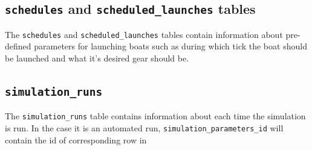 \subsection{\texttt{schedules} and \texttt{scheduled\_launches}
  tables}
The \texttt{schedules} and \texttt{scheduled\_launches} tables contain
information about pre-defined parameters for launching boats such as
during which tick the boat should be launched and what it's desired
gear should be.


\subsection{\texttt{simulation\_runs}}
The \texttt{simulation\_runs} table contains information about each
time the simulation is run. In the case it is an automated run,
\texttt{simulation\_parameters\_id} will contain the id of corresponding row in
